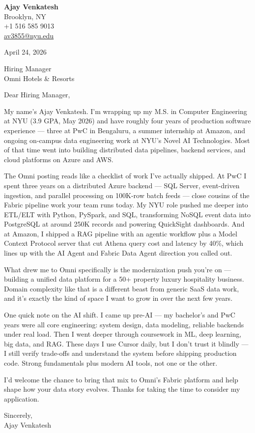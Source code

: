 \documentclass[letterpaper,11pt]{article}
\begin{document}
\begin{flushleft}
\textbf{\large Ajay Venkatesh} \\
Brooklyn, NY \\
+1 516 585 9013 \\
\href{mailto:av3855@nyu.edu}{av3855@nyu.edu}
\end{flushleft}

\vspace{10pt}

April 24, 2026

\vspace{6pt}

Hiring Manager \\
Omni Hotels \& Resorts

\vspace{10pt}

Dear Hiring Manager,

My name's Ajay Venkatesh. I'm wrapping up my M.S. in Computer Engineering at NYU (3.9 GPA, May 2026) and have roughly four years of production software experience --- three at PwC in Bengaluru, a summer internship at Amazon, and ongoing on-campus data engineering work at NYU's Novel AI Technologies. Most of that time went into building distributed data pipelines, backend services, and cloud platforms on Azure and AWS.

The Omni posting reads like a checklist of work I've actually shipped. At PwC I spent three years on a distributed Azure backend --- SQL Server, event-driven ingestion, and parallel processing on 100K-row batch feeds --- close cousins of the Fabric pipeline work your team runs today. My NYU role pushed me deeper into ETL/ELT with Python, PySpark, and SQL, transforming NoSQL event data into PostgreSQL at around 250K records and powering QuickSight dashboards. And at Amazon, I shipped a RAG pipeline with an agentic workflow plus a Model Context Protocol server that cut Athena query cost and latency by 40\%, which lines up with the AI Agent and Fabric Data Agent direction you called out.

What drew me to Omni specifically is the modernization push you're on --- building a unified data platform for a 50+ property luxury hospitality business. Domain complexity like that is a different beast from generic SaaS data work, and it's exactly the kind of space I want to grow in over the next few years.

One quick note on the AI shift. I came up pre-AI --- my bachelor's and PwC years were all core engineering: system design, data modeling, reliable backends under real load. Then I went deeper through coursework in ML, deep learning, big data, and RAG. These days I use Cursor daily, but I don't trust it blindly --- I still verify trade-offs and understand the system before shipping production code. Strong fundamentals plus modern AI tools, not one or the other.

I'd welcome the chance to bring that mix to Omni's Fabric platform and help shape how your data story evolves. Thanks for taking the time to consider my application.

\vspace{12pt}

Sincerely, \\
Ajay Venkatesh
\end{document}
